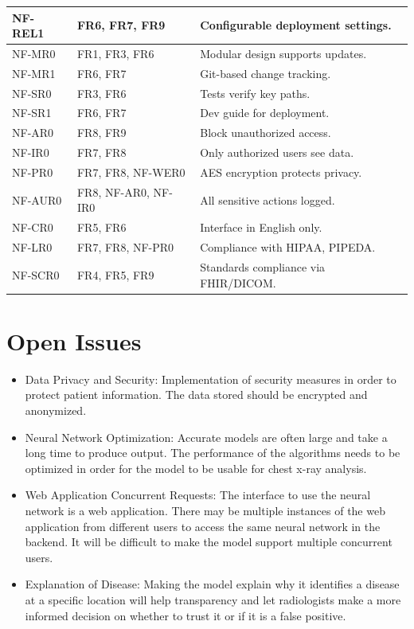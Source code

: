 \documentclass[12pt]{article}
\begin{document}
\begin{tabularx}{\textwidth}{|l|l|X|}
\hline
NF-REL1 & FR6, FR7, FR9 & Configurable deployment settings. \\
\hline
NF-MR0 & FR1, FR3, FR6 & Modular design supports updates. \\
\hline
NF-MR1 & FR6, FR7 & Git-based change tracking. \\
\hline
NF-SR0 & FR3, FR6 & Tests verify key paths. \\
\hline
NF-SR1 & FR6, FR7 & Dev guide for deployment. \\
\hline
NF-AR0 & FR8, FR9 & Block unauthorized access. \\
\hline
NF-IR0 & FR7, FR8 & Only authorized users see data. \\
\hline
NF-PR0 & FR7, FR8, NF-WER0 & AES encryption protects privacy. \\
\hline
NF-AUR0 & FR8, NF-AR0, NF-IR0 & All sensitive actions logged. \\
\hline
NF-CR0 & FR5, FR6 & Interface in English only. \\
\hline
NF-LR0 & FR7, FR8, NF-PR0 & Compliance with HIPAA, PIPEDA. \\
\hline
NF-SCR0 & FR4, FR5, FR9 & Standards compliance via FHIR/DICOM. \\
\hline
\end{tabularx}
\normalsize

\section{Open Issues}
\begin{itemize}
    \item Data Privacy and Security: Implementation of security measures in order to protect 
    patient information. The data stored should be encrypted and anonymized.
    \item Neural Network Optimization: Accurate models are often large and take a long time to 
    produce output. The performance of the algorithms needs to be optimized in order for the model 
    to be usable for chest x-ray analysis.
    \item Web Application Concurrent Requests: The interface to use the neural network is a web 
    application. There may be multiple instances of the web application from different users to 
    access the same neural network in the backend. It will be difficult to make the model support 
    multiple concurrent users.
    \item Explanation of Disease: Making the model explain why it identifies a disease at a 
    specific location will help transparency and let radiologists make a more informed decision on 
    whether to trust it or if it is a false positive.
\end{itemize}
\end{document}
